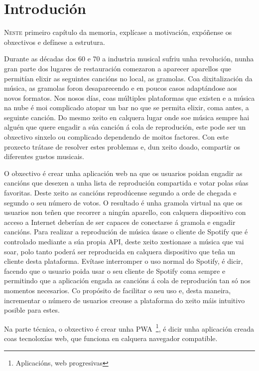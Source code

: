 \chapter{Introdución}
\label{chap:introducion}

\lettrine{N}{este} primeiro capítulo da memoria, explícase a motivación, expóñense os obxectivos e defínese a estrutura.\bigbreak

Durante as décadas dos 60 e 70 a industria musical sufriu unha revolución, nunha gran parte dos lugares de restauración comezaron a aparecer aparellos que permitían elixir as seguintes cancións no local, as gramolas. Coa dixitalización da música, as gramolas foron desaparecendo e en poucos casos adaptándose aos novos formatos. Nos nosos días, coas múltiples plataformas que existen e a música na nube é moi complicado atopar un bar no que se permita elixir, coma antes, a seguinte canción. Do mesmo xeito en calquera lugar onde soe música sempre hai alguén que quere engadir a súa canción á cola de reprodución, este pode ser un obxectivo sinxelo ou complicado dependendo de moitos factores. Con este proxecto trátase de resolver estes problemas e, dun xeito doado, compartir os diferentes gustos musicais.

O obxectivo é crear unha aplicación web na que os usuarios poidan engadir as cancións que desexen a unha lista de reprodución compartida e votar polas súas favoritas. Deste xeito as cancións reprodúcense segundo a orde de chegada e segundo o seu número de votos. O resultado é unha gramola virtual na que os usuarios non teñen que recorrer a ningún aparello, con calquera dispositivo con acceso a Internet deberían de ser capaces de conectarse á gramola e engadir cancións. Para realizar a reprodución de música úsase o cliente de \gls{Spotify} que é controlado mediante a súa propia \gls{API}, deste xeito xestionase a música que vai soar, polo tanto poderá ser reproducida en calquera dispositivo que teña un cliente desta plataforma. Evítase interromper o uso normal do Spotify, é dicir, facendo que o usuario poida usar o seu cliente de \gls{Spotify} coma sempre e permitindo que a aplicación engada as cancións á cola de reprodución tan só nos momentos necesarios. Co propósito de facilitar o seu uso e, desta maneira, incrementar o número de usuarios creouse a plataforma do xeito máis intuitivo posible para estes.

Na parte técnica, o obxectivo é crear unha \gls{PWA}~\cite{pwa}\footnote{Aplicacións, web progresivas}, é dicir unha aplicación creada coas tecnoloxías web, que funciona en calquera navegador compatible.

